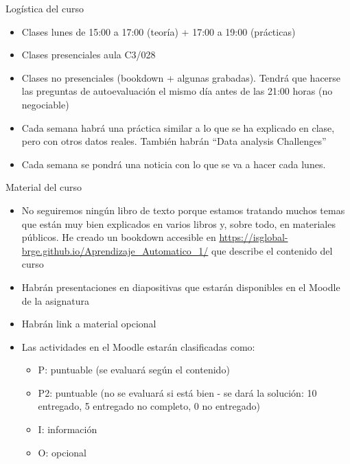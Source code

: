 \documentclass[
  ignorenonframetext,
]{beamer}
\providecommand{\tightlist}{%
  \setlength{\itemsep}{0pt}\setlength{\parskip}{0pt}}
\begin{document}
\begin{frame}{Logística del curso}
\protect\hypertarget{loguxedstica-del-curso}{}
\begin{itemize}
\item
  Clases lunes de 15:00 a 17:00 (teoría) + 17:00 a 19:00 (prácticas)
\item
  Clases presenciales aula C3/028
\item
  Clases no presenciales (bookdown + algunas grabadas). Tendrá que
  hacerse las preguntas de autoevaluación el mismo día antes de las
  21:00 horas (no negociable)
\item
  Cada semana habrá una práctica similar a lo que se ha explicado en
  clase, pero con otros datos reales. También habrán ``Data analysis
  Challenges''
\item
  Cada semana se pondrá una noticia con lo que se va a hacer cada lunes.
\end{itemize}
\end{frame}

\begin{frame}{Material del curso}
\protect\hypertarget{material-del-curso}{}
\begin{itemize}
\item
  No seguiremos ningún libro de texto porque estamos tratando muchos
  temas que están muy bien explicados en varios libros y, sobre todo, en
  materiales públicos. He creado un bookdown accesible en
  \url{https://isglobal-brge.github.io/Aprendizaje_Automatico_1/} que
  describe el contenido del curso
\item
  Habrán presentaciones en diapositivas que estarán disponibles en el
  Moodle de la asignatura
\item
  Habrán link a material opcional
\item
  Las actividades en el Moodle estarán clasificadas como:

  \begin{itemize}
  \tightlist
  \item
    P: puntuable (se evaluará según el contenido)
  \item
    P2: puntuable (no se evaluará si está bien - se dará la solución: 10
    entregado, 5 entregado no completo, 0 no entregado)\\
  \item
    I: información
  \item
    O: opcional
  \end{itemize}
\end{itemize}
\end{frame}
\end{document}
